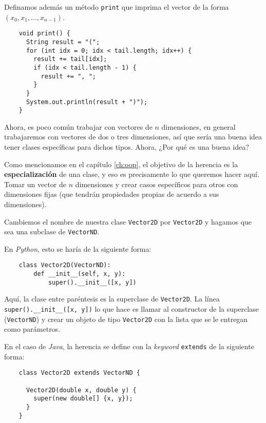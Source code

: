   Definamos además un método \texttt{print} que imprima el vector de la forma \((x_0, x_1, 
  ..., x_{n - 1})\).

  
  \begin{verbatim}
    void print() {
      String result = "(";
      for (int idx = 0; idx < tail.length; idx++) {
        result += tail[idx];
        if (idx < tail.length - 1) {
          result += ", ";
        }
      }
      System.out.println(result + ")");
    }
  \end{verbatim}
  
  Ahora, es poco común trabajar con vectores de \(n\) dimensiones, en general trabajaremos
  con vectores de dos o tres dimensiones, así que sería una buena idea tener clases 
  específicas para dichos tipos.
  Ahora, ¿Por qué es una buena idea?

  Como mencionamos en el capítulo \ref{ch:oop}, el objetivo de la herencia es la 
  \textbf{especialización} de una clase, y eso es precisamente lo que queremos hacer aquí.
  Tomar un vector de \(n\) dimensiones y crear casos específicos para otros con 
  dimensiones fijas (que tendrán propiedades propias de acuerdo a sus dimensiones).

  Cambiemos el nombre de nuestra clase \texttt{Vector2D} por \texttt{Vector2D} y hagamos
  que sea una subclase de \texttt{VectorND}.

  En \textit{Python}, esto se haría de la siguiente forma:

  \begin{verbatim}
    class Vector2D(VectorND):
        def __init__(self, x, y):
            super().__init__([x, y])
  \end{verbatim}

  Aquí, la clase entre paréntesis es la superclase de \texttt{Vector2D}.
  La línea \texttt{super().__init__([x, y])} lo que hace es llamar al 
  constructor de la superclase (\texttt{VectorND}) y crear un objeto de tipo 
  \texttt{Vector2D} con la lista que se le entregan como parámetros.

  En el caso de \textit{Java}, la herencia se define con la \textit{keyword} 
  \texttt{extends} de la siguiente forma:

  \begin{verbatim}
    class Vector2D extends VectorND {

      Vector2D(double x, double y) {
        super(new double[] {x, y});
      }
    }
  \end{verbatim}

